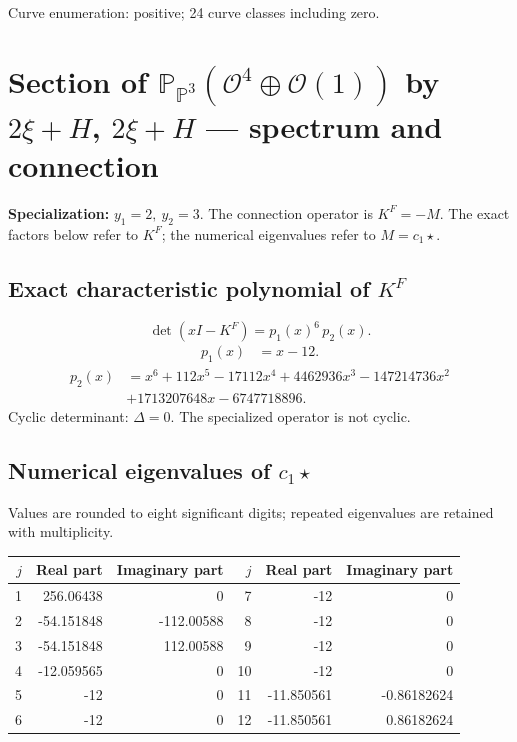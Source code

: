 \documentclass[10pt,a4paper]{article}
\begin{document}
Curve enumeration: positive; 24 curve classes including zero.
\clearpage\section*{Section of $\mathbb P_{\mathbb P^{3}}(\mathcal O^{4}\oplus \mathcal O(1))$ by $2\xi +H$, $2\xi +H$ --- spectrum and connection}
\textbf{Specialization:} $y_1=2,\ y_2=3$. The connection operator is $K^F=-M$. The exact factors below refer to $K^F$; the numerical eigenvalues refer to $M=c_1\star$.
\subsection*{Exact characteristic polynomial of $K^F$}
\[\det(xI-K^F)=p_{1}(x)^{6}\,p_{2}(x).\]
\[\begin{aligned}p_{1}(x)&=x - 12.\end{aligned}\]
\[\begin{aligned}p_{2}(x)&=x^{6} + 112 x^{5} - 17112 x^{4} + 4462936 x^{3} - 147214736 x^{2}\\&+1713207648 x - 6747718896.\end{aligned}\]
Cyclic determinant: $\Delta=0$. The specialized operator is not cyclic.
\subsection*{Numerical eigenvalues of $c_1\star$}
Values are rounded to eight significant digits; repeated eigenvalues are retained with multiplicity.
\begin{center}\small\begin{tabular}{rrr@{\qquad}rrr}\toprule $j$ & Real part & Imaginary part & $j$ & Real part & Imaginary part\\\midrule
1 & 256.06438 & 0 & 7 & -12 & 0\\
2 & -54.151848 & -112.00588 & 8 & -12 & 0\\
3 & -54.151848 & 112.00588 & 9 & -12 & 0\\
4 & -12.059565 & 0 & 10 & -12 & 0\\
5 & -12 & 0 & 11 & -11.850561 & -0.86182624\\
6 & -12 & 0 & 12 & -11.850561 & 0.86182624\\
\bottomrule\end{tabular}\end{center}
\end{document}
